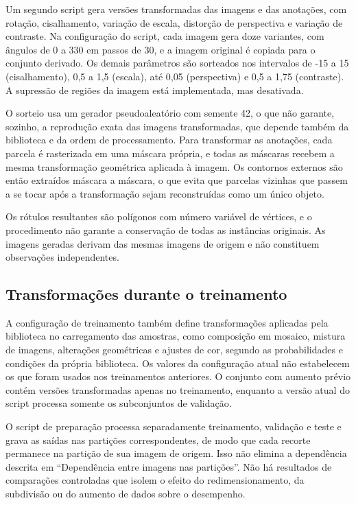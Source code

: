 Um segundo script gera vers\~oes transformadas das imagens e das anota\c{c}\~oes, com rota\c{c}\~ao, cisalhamento, varia\c{c}\~ao de escala, distor\c{c}\~ao de perspectiva e varia\c{c}\~ao de contraste. Na configura\c{c}\~ao do script, cada imagem gera doze variantes, com \^angulos de 0\textdegree{} a 330\textdegree{} em passos de 30\textdegree{}, e a imagem original \'e copiada para o conjunto derivado. Os demais par\^ametros s\~ao sorteados nos intervalos de -15\textdegree{} a 15\textdegree{} (cisalhamento), 0,5 a 1,5 (escala), at\'e 0,05 (perspectiva) e 0,5 a 1,75 (contraste). A supress\~ao de regi\~oes da imagem est\'a implementada, mas desativada.

O sorteio usa um gerador pseudoaleat\'orio com semente 42, o que n\~ao garante, sozinho, a reprodu\c{c}\~ao exata das imagens transformadas, que depende tamb\'em da biblioteca e da ordem de processamento. Para transformar as anota\c{c}\~oes, cada parcela \'e rasterizada em uma m\'ascara pr\'opria, e todas as m\'ascaras recebem a mesma transforma\c{c}\~ao geom\'etrica aplicada \`a imagem. Os contornos externos s\~ao ent\~ao extra\'idos m\'ascara a m\'ascara, o que evita que parcelas vizinhas que passem a se tocar ap\'os a transforma\c{c}\~ao sejam reconstru\'idas como um \'unico objeto.

Os r\'otulos resultantes s\~ao pol\'igonos com n\'umero vari\'avel de v\'ertices, e o procedimento n\~ao garante a conserva\c{c}\~ao de todas as inst\^ancias originais. As imagens geradas derivam das mesmas imagens de origem e n\~ao constituem observa\c{c}\~oes independentes.

\subsection{Transforma\c{c}\~oes durante o treinamento}
\label{sec:transformacoes-treinamento}

A configura\c{c}\~ao de treinamento tamb\'em define transforma\c{c}\~oes aplicadas pela biblioteca no carregamento das amostras, como composi\c{c}\~ao em mosaico, mistura de imagens, altera\c{c}\~oes geom\'etricas e ajustes de cor, segundo as probabilidades e condi\c{c}\~oes da pr\'opria biblioteca. Os valores da configura\c{c}\~ao atual n\~ao estabelecem os que foram usados nos treinamentos anteriores. O conjunto com aumento pr\'evio cont\'em vers\~oes transformadas apenas no treinamento, enquanto a vers\~ao atual do script processa somente os subconjuntos de valida\c{c}\~ao.

O script de prepara\c{c}\~ao processa separadamente treinamento, valida\c{c}\~ao e teste e grava as sa\'idas nas parti\c{c}\~oes correspondentes, de modo que cada recorte permanece na parti\c{c}\~ao de sua imagem de origem. Isso n\~ao elimina a depend\^encia descrita em ``Depend\^encia entre imagens nas parti\c{c}\~oes''. N\~ao h\'a resultados de compara\c{c}\~oes controladas que isolem o efeito do redimensionamento, da subdivis\~ao ou do aumento de dados sobre o desempenho.


